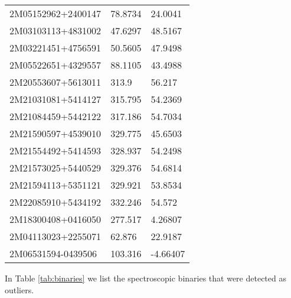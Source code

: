\documentclass[fleqn,usenatbib]{mnras}
\begin{document}
\begin{table}
\begin{tabular}{lll}
2M05152962+2400147 &  78.8734 &  24.0041 \\
2M03103113+4831002 &  47.6297 &  48.5167 \\
2M03221451+4756591 &  50.5605 &  47.9498 \\
2M05522651+4329557 &  88.1105 &  43.4988 \\
2M20553607+5613011 &    313.9 &   56.217 \\
2M21031081+5414127 &  315.795 &  54.2369 \\
2M21084459+5442122 &  317.186 &  54.7034 \\
2M21590597+4539010 &  329.775 &  45.6503 \\
2M21554492+5414593 &  328.937 &  54.2498 \\
2M21573025+5440529 &  329.376 &  54.6814 \\
2M21594113+5351121 &  329.921 &  53.8534 \\
2M22085910+5434192 &  332.246 &   54.572 \\
2M18300408+0416050 &  277.517 &  4.26807 \\
2M04113023+2255071 &   62.876 &  22.9187 \\
2M06531594-0439506 &  103.316 & -4.66407 \\
  \bottomrule
  \end{tabular}
\end{table}

In Table \ref{tab:binaries} we list the spectroscopic binaries that were detected as outliers.
\end{document}
